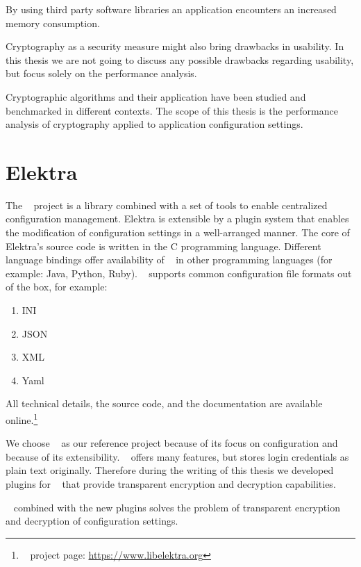 By using third party software libraries an application encounters an increased memory consumption.

\label{intro-hypo-2}

Cryptography as a security measure might also bring drawbacks in usability.
In this thesis we are not going to discuss any possible drawbacks regarding usability, but focus solely on the performance analysis.

Cryptographic algorithms and their application have been studied and benchmarked in different contexts.\cite{ocf,freebsdtls,thakur2011aes}
The scope of this thesis is the performance analysis of cryptography applied to application configuration settings.

\section{Elektra}

The \elektra~ project is a library combined with a set of tools to enable centralized configuration management.
Elektra is extensible by a plugin system that enables the modification of configuration settings in a well-arranged manner.
The core of Elektra's source code is written in the C programming language.
Different language bindings offer availability of \elektra~ in other programming languages (for example: Java, Python, Ruby).
\elektra~ supports common configuration file formats out of the box, for example:\cite{elektra-doc,raab2010thesis}
\begin{enumerate}
\item INI
\item JSON
\item XML
\item Yaml
\end{enumerate}

All technical details, the source code, and the documentation are available online.\footnote{\elektra~ project page: \url{https://www.libelektra.org}}

We choose \elektra~ as our reference project because of its focus on configuration and because of its extensibility.
\elektra~ offers many features, but stores login credentials as plain text originally.
Therefore during the writing of this thesis we developed plugins for \elektra~ that provide transparent encryption and decryption capabilities.

\elektra~ combined with the new plugins solves the problem of transparent encryption and decryption of configuration settings.

